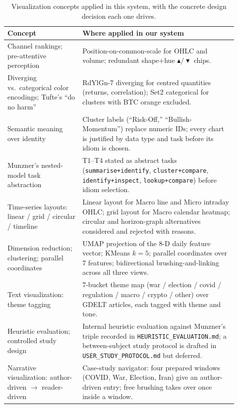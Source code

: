 \documentclass[journal,hideappendix]{vgtc}      %
\begin{document}
\begin{table}[t]
\centering
\caption{Visualization concepts applied in this system, with the
concrete design decision each one drives.}
\label{tab:concept-map}
\footnotesize
\setlength{\tabcolsep}{4pt}
\renewcommand{\arraystretch}{1.1}
\begin{tabular}{@{}p{0.30\linewidth} p{0.62\linewidth}@{}}
\toprule
\textbf{Concept} & \textbf{Where applied in our system} \\
\midrule
Channel rankings; pre-attentive perception            & Position-on-common-scale for OHLC and volume; redundant shape+hue $\blacktriangle/\blacktriangledown$ chips. \\
Diverging vs.\ categorical color encodings; Tufte's ``do no harm''     & RdYlGn-7 diverging for centred quantities (returns, correlation); Set2 categorical for clusters with BTC orange excluded. \\
Semantic meaning over identity                        & Cluster labels (``Risk-Off,'' ``Bullish-Momentum'') replace numeric IDs; every chart is justified by data type and task before its idiom is chosen. \\
Munzner's nested-model task abstraction               & T1--T4 stated as abstract tasks (\texttt{summarise+identify}, \texttt{cluster+compare}, \texttt{identify+inspect}, \texttt{lookup+compare}) before idiom selection. \\
Time-series layouts: linear / grid / circular / timeline & Linear layout for Macro line and Micro intraday OHLC; grid layout for Macro calendar heatmap; circular and horizon-graph alternatives considered and rejected with reasons. \\
Dimension reduction; clustering; parallel coordinates & UMAP projection of the 8-D daily feature vector; KMeans $k=5$; parallel coordinates over 7 features; bidirectional brushing-and-linking across all three views. \\
Text visualization: theme tagging                     & 7-bucket theme map (war / election / covid / regulation / macro / crypto / other) over GDELT articles, each tagged with theme and tone. \\
Heuristic evaluation; controlled study design         & Internal heuristic evaluation against Munzner's triple recorded in \texttt{HEURISTIC\_EVALUATION.md}; a between-subject study protocol is drafted in \texttt{USER\_STUDY\_PROTOCOL.md} but deferred. \\
Narrative visualization: author-driven $\to$ reader-driven & Case-study navigator: four prepared windows (COVID, War, Election, Iran) give an author-driven entry; free brushing takes over once inside a window. \\
\bottomrule
\end{tabular}
\end{table}
\end{document}
